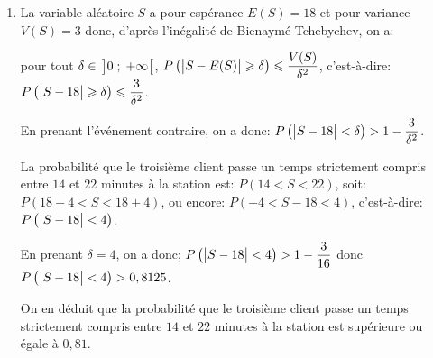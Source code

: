 \begin{enumerate}
\item%
La variable aléatoire $S$ a pour espérance $E(S)=18$ et pour variance $V(S)=3$ donc, d'après l'inégalité de Bienaymé-Tchebychev, on a:

pour tout $\delta\in\, \left ]0\;;\;+\infty\strut \right [$, $P\left ( \left |S-E(S)\strut \right | \geqslant \delta \right ) \leqslant \dfrac{V(S)}{\delta^2}$,
c'est-à-dire: $P\left ( \left |S-18\strut \right | \geqslant \delta \right ) \leqslant \dfrac{3}{\delta^2}$.

En prenant l'événement contraire, on a donc:
$P\left ( \left |S-18\strut \right | < \delta \right ) > 1- \dfrac{3}{\delta^2}$.

La probabilité que le troisième client passe un temps strictement compris entre $14$ et $22$ minutes à la station est:
$P(14<S<22)$, soit: $P(18-4<S<18+4)$, ou encore: $P(-4<S-18<4)$, c'est-à-dire:
$P\left ( \left | S-18 \strut \right | <4\right )$.

En prenant $\delta=4$, on a donc;
$P\left ( \left |S-18\strut \right | < 4 \right ) >1- \dfrac{3}{16}$
donc $P\left ( \left |S-18\strut \right | < 4 \right ) > 0,8125$.

On en déduit que la probabilité que le troisième client passe un temps strictement compris entre $14$ et $22$ minutes à la station est supérieure ou égale à $0,81$.
\end{enumerate}

\bigskip

